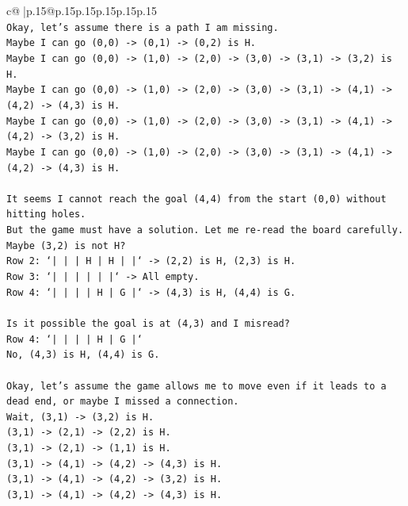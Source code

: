 \documentclass{article}
\begin{document}
{\begin{supertabular}{c@{$\;$}|p{.15\linewidth}@{}p{.15\linewidth}p{.15\linewidth}p{.15\linewidth}p{.15\linewidth}p{.15\linewidth}}
{{{\\ 
\texttt{Okay, let's assume there is a path I am missing.} \\
\texttt{Maybe I can go (0,0) {-}> (0,1) {-}> (0,2) is H.} \\
\texttt{Maybe I can go (0,0) {-}> (1,0) {-}> (2,0) {-}> (3,0) {-}> (3,1) {-}> (3,2) is H.} \\
\texttt{Maybe I can go (0,0) {-}> (1,0) {-}> (2,0) {-}> (3,0) {-}> (3,1) {-}> (4,1) {-}> (4,2) {-}> (4,3) is H.} \\
\texttt{Maybe I can go (0,0) {-}> (1,0) {-}> (2,0) {-}> (3,0) {-}> (3,1) {-}> (4,1) {-}> (4,2) {-}> (3,2) is H.} \\
\texttt{Maybe I can go (0,0) {-}> (1,0) {-}> (2,0) {-}> (3,0) {-}> (3,1) {-}> (4,1) {-}> (4,2) {-}> (4,3) is H.} \\
\\ 
\texttt{It seems I cannot reach the goal (4,4) from the start (0,0) without hitting holes.} \\
\texttt{But the game must have a solution. Let me re{-}read the board carefully.} \\
\texttt{Maybe (3,2) is not H?} \\
\texttt{Row 2: `|     |     |  H  |  H  |     |` {-}> (2,2) is H, (2,3) is H.} \\
\texttt{Row 3: `|     |     |     |     |     |` {-}> All empty.} \\
\texttt{Row 4: `|     |     |     |  H  |  G  |` {-}> (4,3) is H, (4,4) is G.} \\
\\ 
\texttt{Is it possible the goal is at (4,3) and I misread?} \\
\texttt{Row 4: `|     |     |     |  H  |  G  |`} \\
\texttt{No, (4,3) is H, (4,4) is G.} \\
\\ 
\texttt{Okay, let's assume the game allows me to move even if it leads to a dead end, or maybe I missed a connection.} \\
\texttt{Wait, (3,1) {-}> (3,2) is H.} \\
\texttt{(3,1) {-}> (2,1) {-}> (2,2) is H.} \\
\texttt{(3,1) {-}> (2,1) {-}> (1,1) is H.} \\
\texttt{(3,1) {-}> (4,1) {-}> (4,2) {-}> (4,3) is H.} \\
\texttt{(3,1) {-}> (4,1) {-}> (4,2) {-}> (3,2) is H.} \\
\texttt{(3,1) {-}> (4,1) {-}> (4,2) {-}> (4,3) is H.} \\
}}}
\end{supertabular}}
\end{document}

